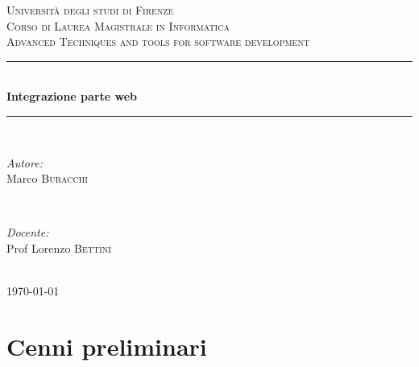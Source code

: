 \documentclass[12pt]{article}
\begin{document}

\begin{titlepage}

\newcommand{\HRule}{\rule{\linewidth}{0.5mm}}

\center

\textsc{\LARGE Università degli studi di Firenze}\\[1.5cm]
\textsc{\Large Corso di Laurea Magistrale in Informatica}\\[0.5cm]
\textsc{\large Advanced Techniques and tools for software development}\\[0.5cm]

\HRule \\[0.4cm]
{ \huge \bfseries Integrazione parte web}\\[0.4cm]
\HRule \\[1.5cm]

\begin{minipage}{0.4\textwidth}
	\begin{flushleft} \large
		\emph{Autore:}\\
		Marco \textsc{Buracchi}
	\end{flushleft}
\end{minipage}
~
\begin{minipage}{0.4\textwidth}
	\begin{flushright} \large
		\emph{Docente:} \\
		Prof Lorenzo \textsc{Bettini}
	\end{flushright}
\end{minipage}\\[4cm]

{\large \today}\\[3cm] %
\vfill %

\end{titlepage}


\section{Cenni preliminari}
\end{document}
